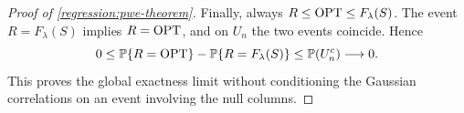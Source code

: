 \begin{proof}[Proof of \cref{regression:pwe-theorem}]
Finally, always $R\leq\operatorname{OPT}\leq F_\lambda(S)$.
The event $R=F_\lambda(S)$ implies $R=\operatorname{OPT}$, and on $U_n$
the two events coincide. Hence
\[
 0\leq\mathbb{P}\{R=\operatorname{OPT}\}-\mathbb{P}\{R=F_\lambda(S)\}
                             \leq\mathbb{P}(U_n^c)\longrightarrow0.
\]
This proves the global exactness limit without conditioning the
Gaussian correlations on an event involving the null columns.
\end{proof}
